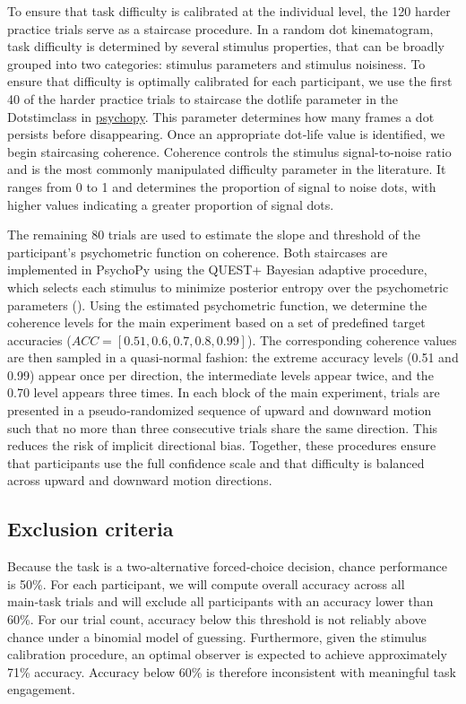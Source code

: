 \documentclass[
]{article}
\begin{document}
To ensure that task difficulty is calibrated at the individual level,
the 120 harder practice trials serve as a staircase procedure. In a
random dot kinematogram, task difficulty is determined by several
stimulus properties, that can be broadly grouped into two categories:
stimulus parameters and stimulus noisiness. To ensure that difficulty is
optimally calibrated for each participant, we use the first 40 of the
harder practice trials to staircase the dotlife parameter in the
Dotstimclass in
\href{https://www.psychopy.org/api/visual/dotstim.html}{psychopy}. This
parameter determines how many frames a dot persists before disappearing.
Once an appropriate dot‑life value is identified, we begin staircasing
coherence. Coherence controls the stimulus signal-to-noise ratio and is
the most commonly manipulated difficulty parameter in the literature. It
ranges from 0 to 1 and determines the proportion of signal to noise
dots, with higher values indicating a greater proportion of signal dots.

The remaining 80 trials are used to estimate the slope and threshold of
the participant's psychometric function on coherence. Both staircases
are implemented in PsychoPy using the QUEST+ Bayesian adaptive
procedure, which selects each stimulus to minimize posterior entropy
over the psychometric parameters
(). Using the estimated psychometric function, we determine the
coherence levels for the main experiment based on a set of predefined
target accuracies (\(ACC = [0.51, 0.6, 0.7, 0.8, 0.99]\)). The
corresponding coherence values are then sampled in a quasi‑normal
fashion: the extreme accuracy levels (0.51 and 0.99) appear once per
direction, the intermediate levels appear twice, and the 0.70 level
appears three times. In each block of the main experiment, trials are
presented in a pseudo‑randomized sequence of upward and downward motion
such that no more than three consecutive trials share the same
direction. This reduces the risk of implicit directional bias. Together,
these procedures ensure that participants use the full confidence scale
and that difficulty is balanced across upward and downward motion
directions.

\subsection{Exclusion criteria}\label{exclusion-criteria}

Because the task is a two‑alternative forced‑choice decision, chance
performance is 50\%. For each participant, we will compute overall
accuracy across all main‑task trials and will exclude all participants
with an accuracy lower than 60\%. For our trial count, accuracy below
this threshold is not reliably above chance under a binomial model of
guessing. Furthermore, given the stimulus calibration procedure, an
optimal observer is expected to achieve approximately 71\% accuracy.
Accuracy below 60\% is therefore inconsistent with meaningful task
engagement.
\end{document}

